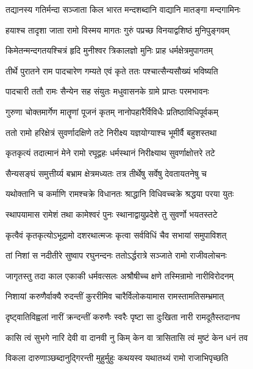 \twolineshloka
{तद्यानस्य गतिर्मन्दा सञ्जाता किल भारत}
{मन्दशब्दानि वाद्यानि मातङ्गा मन्दगामिनः}%

\twolineshloka
{हयाश्च तादृशा जाता रामो विस्मय मागतः}
{गुरुं पप्रच्छ विनयाद्वशिष्ठं मुनिपुङ्गवम्}%

\twolineshloka
{किमेतन्मन्दगतयश्चित्रं हृदि मुनीश्वर}
{त्रिकालज्ञो मुनिः प्राह धर्मक्षेत्रमुपागतम्}%

\twolineshloka
{तीर्थे पुरातने राम पादचारेण गम्यते}
{एवं कृते ततः पश्चात्सैन्यसौख्यं भविष्यति}%

\twolineshloka
{पादचारी ततौ रामः सैन्येन सह संयुतः}
{मधुवासनके ग्रामे प्राप्तः परमभावनः}%

\twolineshloka
{गुरुणा चोक्तमार्गेण मातॄणां पूजनं कृतम्}
{नानोपहारैर्विविधैः प्रतिष्ठाविधिपूर्वकम्}%

\twolineshloka
{ततो रामो हरिक्षेत्रं सुवर्णादक्षिणे तटे}
{निरीक्ष्य यज्ञयोग्याश्च भूमीर्वै बहुशस्तथा}%

\twolineshloka
{कृतकृत्यं तदात्मानं मेने रामो रघूद्वहः}
{धर्मस्थानं निरीक्ष्याथ सुवर्णाक्षोत्तरे तटे}%

\twolineshloka
{सैन्यसङ्घं समुत्तीर्य्य बभ्राम क्षेत्रमध्यतः}
{तत्र तीर्थेषु सर्वेषु देवतायतनेषु च}%

\twolineshloka
{यथोक्तानि च कर्माणि रामश्चक्रे विधानतः}
{श्राद्धानि विधिवच्चक्रे श्रद्धया परया युतः}%

\twolineshloka
{स्थापयामास रामेशं तथा कामेश्वरं पुनः}
{स्थानाद्वायुप्रदेशे तु सुवर्णो भयतस्तटे}%

\twolineshloka
{कृत्वैवं कृतकृत्योऽभूद्रामो दशरथात्मजः}
{कृत्वा सर्वविधिं चैव सभायां समुपाविशत्}%

\twolineshloka
{तां निशां स नदीतीरे सुष्वाप रघुनन्दनः}
{ततोऽर्द्धरात्रे सञ्जाते रामो राजीवलोचनः}%

\twolineshloka
{जागृतस्तु तदा काल एकाकी धर्मवत्सलः}
{अश्रौषीच्च क्षणे तस्मिन्रामो नारीविरोदनम्}%

\twolineshloka
{निशायां करुणैर्वाक्यै रुदन्तीं कुररीमिव}
{चारैर्विलोकयामास रामस्तामतिसम्भ्रमात्}%

\twolineshloka
{दृष्ट्वातिविह्वलां नारीं क्रन्दन्तीं करुणैः स्वरैः}
{पृष्टा सा दुःखिता नारी रामदूतैस्तदानघ}%


\twolineshloka
{कासि त्वं सुभगे नारि देवी वा दानवी नु किम्}
{केन वा त्रासितासि त्वं मुष्टं केन धनं तव}%

\twolineshloka
{विकला दारुणाञ्छब्दानुद्गिरन्ती मुहुर्मुहुः}
{कथयस्व यथातथ्यं रामो राजाभिपृच्छति}%

